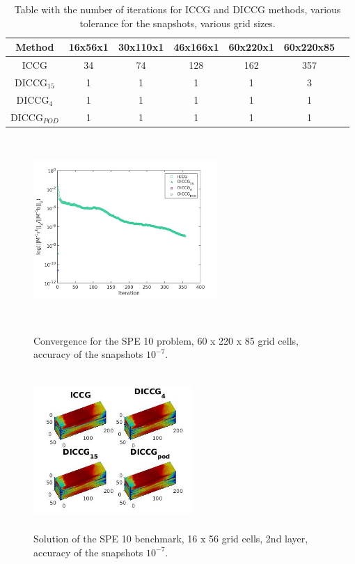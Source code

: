 \documentclass[12pt]{article}
\begin{document}
\begin{table}[!ht]
\centering
\begin{tabular}{|c |c|c|c|c|c| c| } 
 \hline
Method  & 16x56x1& 30x110x1& 46x166x1& 60x220x1&60x220x85\\
   \hline
  ICCG & 34 & 74&  128 &  162&357 \\ 
   DICCG$_{15}$ & 1 & 1&  1 &  1& 3\\ 
   DICCG$_{4}$ & 1 & 1&  1 &  1& 1\\  
   DICCG$_{POD}$ & 1 & 1&  1 &  1 &1\\ 
\hline
\end{tabular}
\caption{Table with the number of iterations for ICCG and DICCG methods, various tolerance for the snapshots,
various grid sizes.}
\label{table:itgrid}
\end{table}
\begin{figure}[!h]
\centering
\begin{minipage}{.5\textwidth}
 \centering
\includegraphics[width=7cm,height=7cm,keepaspectratio]
{conv_spe10c.jpg}
\caption{Convergence for the SPE 10 problem, 60 x 220 x 85 grid cells, accuracy of the snapshots $10 ^{-7}$.}
\label{fig:convspe}
\end{minipage}%
\hspace{4mm}
\begin{minipage}{.45\textwidth}
 \centering
\includegraphics[width=6cm,height=6cm,keepaspectratio]
{sol_spe10c.jpg}
\caption{Solution of the SPE 10 benchmark, 16 x 56 grid cells, 2nd layer, accuracy of the snapshots $10 ^{-7}$.}
\label{fig:solspe}
\end{minipage}
\end{figure}
\newpage
\end{document}
